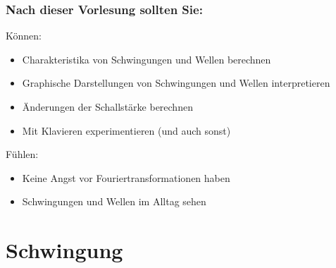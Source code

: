 \documentclass{beamer}
\begin{document}
\begin{frame}

\frametitle{Nach dieser Vorlesung sollten Sie:}
 

\begin{block}{Können:}
\begin{itemize}
\item
Charakteristika von Schwingungen und Wellen berechnen
\item
Graphische Darstellungen von Schwingungen und Wellen interpretieren
\item
Änderungen der Schallstärke berechnen
\item
Mit Klavieren experimentieren (und auch sonst) 
\end{itemize}
\end{block}

\begin{block}{Fühlen:}

\begin{itemize}
\item
Keine Angst vor Fouriertransformationen haben
\item
Schwingungen und Wellen im Alltag sehen 


\end{itemize}

\end{block}


\end{frame}





\section{Schwingung}
\end{document}
